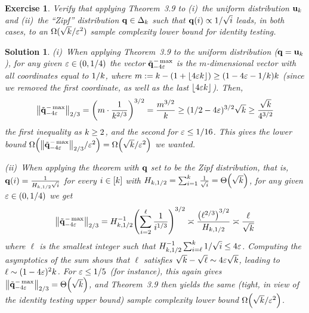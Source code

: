 \documentclass[biber]{nowfnt} %
\newtheorem{question}{Exercise}[chapter]
\newtheorem{solution}{Solution}[chapter]
\begin{document}
\begin{question}\label{ex:2/3:lb:applications}
Verify that applying Theorem~3.9 to (i)~the uniform distribution $\mathbf{u}_k$ and (ii)~the ``Zipf'' distribution $\mathbf{q}\in\Delta_{k}$ such that $\mathbf{q}(i) \propto 1/\sqrt{i}$ leads, in both cases, to an $\Omega(\sqrt{k}/\varepsilon^2)$ sample complexity lower bound for identity testing.
\end{question}
\begin{solution}
(i)~When applying Theorem~3.9 to the uniform distribution (\ie $\mathbf{q}=\mathbf{u}_{ k } $), for any given $\varepsilon \in (0,1/4)$ the vector $\tilde{\mathbf{q}}^{-\max}_{-4\varepsilon}$ is the $m$-dimensional vector with all coordinates equal to $1/k$, where $m \eqdef \ab-(1+\flr{4\dst\ab}) \geq (1-4\dst-1/\ab)\ab$ (since we removed the first coordinate, as well as the last $\flr{4\dst\ab}$). Then,
\[
	\norm{\tilde{\q}^{-\max}_{-4\dst}}_{2/3} = \Paren{m \cdot \frac{1}{\ab^{2/3}}}^{3/2} = \frac{m^{3/2}}{\ab}
	\geq (1/2-4\dst)^{3/2} \sqrt{\ab} \geq \frac{\sqrt{\ab}}{4^{3/2}}
\]
the first inequality as $k \geq 2$, and the second for $\varepsilon \leq 1/16$. This gives the lower bound $\bigOmega{\norm{\tilde{\q}^{-\max}_{-4\dst}}_{2/3}/\dst^2} = \bigOmega{\sqrt{\ab}/\dst^2}$ we wanted.\medskip

(ii)~When applying the theorem with $\mathbf{q}$ set to be the Zipf distribution, that is, $\mathbf{q}(i) = \frac{1}{H_{k, 1/2}\sqrt{i}}$ for every $i\in [k]$ with $H_{\ab, 1/2}  = \sum_{i=1}^\ab \frac{1}{\sqrt{i}} = \bigTheta{\sqrt{\ab}}$, for any given $\varepsilon\in(0,1/4)$ we get
\[
	\norm{\tilde{\q}^{-\max}_{-4\dst}}_{2/3}
	= H_{\ab, 1/2}^{-1}  \Paren{ \sum_{i=2}^{\ell} \frac{1}{i^{1/3}} }^{3/2} \asymp \frac{\Paren{ \ell^{2/3} }^{3/2}}{H_{\ab, 1/2}}
	\asymp \frac{\ell}{\sqrt{\ab}}
\]
where $\ell$ is the smallest integer such that $H_{k, 1/2}^{-1}\sum_{i=\ell}^k 1/\sqrt{i} \leq 4\varepsilon$. Computing the asymptotics of the sum shows that $\ell$ satisfies $\sqrt{k}-\sqrt{\ell} \sim 4\varepsilon\sqrt{k}$, leading to $\ell \sim (1-4\varepsilon)^2 k$. For $\varepsilon \leq 1/5$ (for instance), this again gives $\norm{\tilde{\q}^{-\max}_{-4\dst}}_{2/3} = \bigTheta{\sqrt{\ab}}$, and Theorem~3.9 then yields the same (tight, in view of the identity testing upper bound) sample complexity lower bound $\bigOmega{\sqrt{\ab}/\dst^2}$.
\end{solution}
\end{document}
